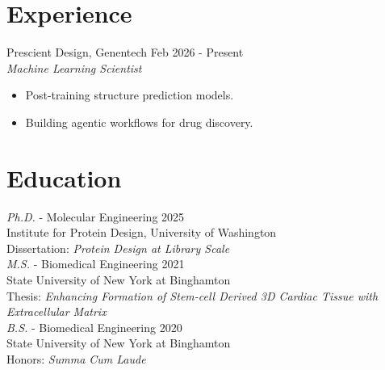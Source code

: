 \documentclass[letter]{res}
\begin{document}
\address{ \href{https://jacobgershon.com}{jacobgershon.com} \\}
\address{ \texttt{nohsr3g@gmail.com}\\ }

\begin{resume}
\hspace{-8mm}\noindent\makebox[\linewidth]{\rule{\paperwidth}{0.4pt}}


\section{Experience}
Prescient Design, Genentech \hfill Feb 2026 - Present\\
{\sl Machine Learning Scientist}\\
 \vspace{-2mm}
 \begin{itemize}
 \item Post-training structure prediction models.
 \item Building agentic workflows for drug discovery.
 \end{itemize}
  \vspace{-2mm}

\section{Education}
\textit{Ph.D.} - Molecular Engineering \hfill 2025\\
Institute for Protein Design, University of Washington\\
Dissertation: \textit{Protein Design at Library Scale}\\[3pt]
\textit{M.S.} - Biomedical Engineering \hfill 2021\\
State University of New York at Binghamton\\
Thesis: \textit{Enhancing Formation of Stem-cell Derived 3D Cardiac Tissue with Extracellular Matrix}\\[3pt]
\textit{B.S.} - Biomedical Engineering \hfill 2020\\
State University of New York at Binghamton\\
Honors: \textit{Summa Cum Laude}
  \vspace{-2mm}


\end{resume}
\end{document}
